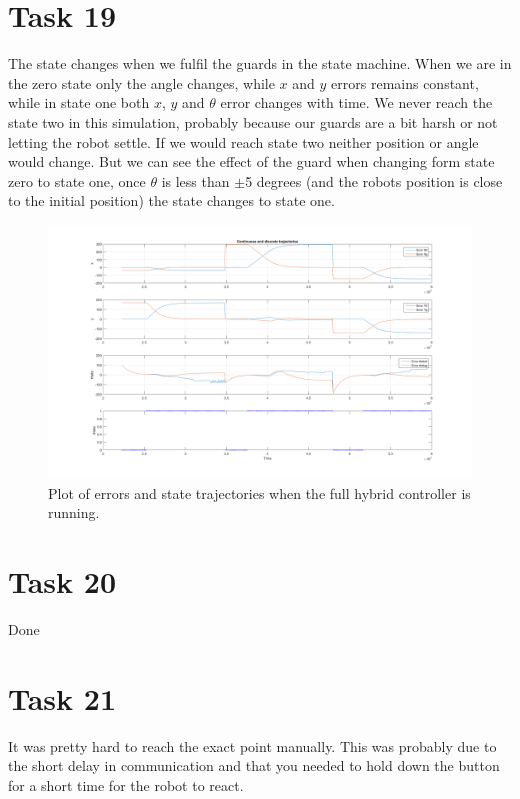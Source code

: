 \documentclass[a4paper,12pt,oneside,onecolumn]{article} %
\begin{document}
\section*{Task 19}

The state changes when we fulfil the guards in the state machine. When we are in the zero state only the angle changes, while $x$ and $y$ errors remains constant, while in state one both $x$, $y$ and $\theta$ error changes with time. We never reach the state two in this simulation, probably because our guards are a bit harsh or not letting the robot settle. If we would reach state two neither position or angle would change. But we can see the effect of the guard when changing form state zero to state one, once $\theta$ is less than $\pm$5 degrees (and the robots position is close to the initial position) the state changes to state one.

\begin{figure}[H]
\begin{center}	
  \includegraphics[width=1.2\textwidth]{task19b.png}
  \caption{Plot of errors and state trajectories when the full hybrid controller is running.}\label{19}
 \end{center}
\end{figure}

\section*{Task 20}

Done

\section*{Task 21}

It was pretty hard to reach the exact point manually. This was probably due to the short delay in communication and that you needed to hold down the button for a short time for the robot to react.
\end{document}
